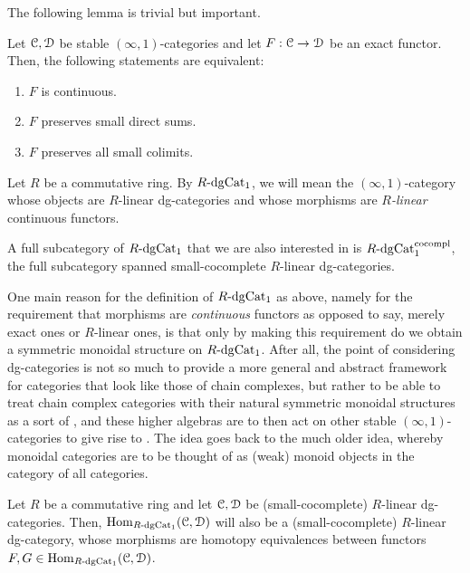             The following lemma is trivial but important.
            \begin{lemma}
                Let $\mathcal{C}, \mathcal{D}$ be stable $(\infty, 1)$-categories and let $F: \mathcal{C} \to \mathcal{D}$ be an exact functor. Then, the following statements are equivalent:
                \begin{enumerate}
                    \item $F$ is continuous.
                    \item $F$ preserves small direct sums.
                    \item $F$ preserves all small colimits.
                \end{enumerate}
            \end{lemma}

            \begin{definition}[$R\-\dg\Cat_1$] \label{def: (infinity, 1)_category_of_dg_categories}
                Let $R$ be a commutative ring. By $R\-\dg\Cat_1$, we will mean the $(\infty, 1)$-category whose objects are $R$-linear dg-categories and whose morphisms are \textit{$R$-linear} continuous functors.

                A full subcategory of $R\-\dg\Cat_1$ that we are also interested in is $R\text{-}\mathrm{dg}\mathrm{Cat}_1^{\mathrm{co}\mathrm{compl}}$, the full subcategory spanned small-cocomplete $R$-linear dg-categories.
            \end{definition}
            \begin{remark}
                One main reason for the definition of $R\-\dg\Cat_1$ as above, namely for the requirement that morphisms are \textit{continuous} functors as opposed to say, merely exact ones or $R$-linear ones, is that only by making this requirement do we obtain a symmetric monoidal structure on $R\-\dg\Cat_1$. After all, the point of considering dg-categories is not so much to provide a more general and abstract framework for categories that look like those of chain complexes, but rather to be able to treat chain complex categories with their natural symmetric monoidal structures as a sort of , and these higher algebras are to then act on other stable $(\infty, 1)$-categories to give rise to . The idea goes back to the much older idea, whereby monoidal categories are to be thought of as (weak) monoid objects in the category of all categories.
            \end{remark}

            \begin{lemma} \label{lemma: hom_of_dg_categories}
                Let $R$ be a commutative ring and let $\mathcal{C}, \mathcal{D}$ be (small-cocomplete) $R$-linear dg-categories. Then, $\mathrm{Hom}_{R\text{-}\mathrm{dg}\mathrm{Cat}_1}(\mathcal{C}, \mathcal{D})$ will also be a (small-cocomplete) $R$-linear dg-category, whose morphisms are homotopy equivalences between functors $F, G \in \mathrm{Hom}_{R\text{-}\mathrm{dg}\mathrm{Cat}_1}(\mathcal{C}, \mathcal{D})$.
            \end{lemma}

